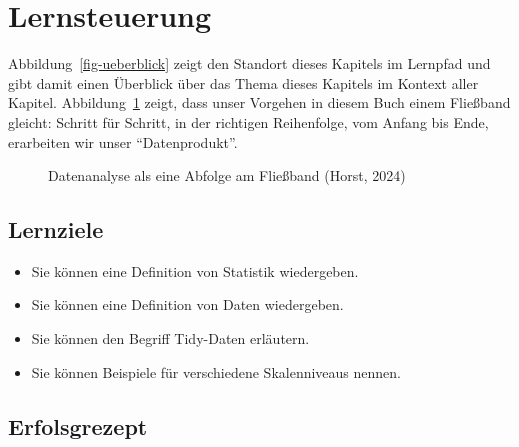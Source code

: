 \documentclass[
  letterpaper,
]{scrbook}
\providecommand{\tightlist}{%
  \setlength{\itemsep}{0pt}\setlength{\parskip}{0pt}}\usepackage{longtable,booktabs,array}
\theoremstyle{definition}
\theoremstyle{definition}
\theoremstyle{definition}
\theoremstyle{remark}
\begin{document}
\section{Lernsteuerung}\label{lernsteuerung}

Abbildung~\ref{fig-ueberblick} zeigt den Standort dieses Kapitels im
Lernpfad und gibt damit einen Überblick über das Thema dieses Kapitels
im Kontext aller Kapitel. Abbildung~\ref{fig-tidy5} zeigt, dass unser
Vorgehen in diesem Buch einem Fließband gleicht: Schritt für Schritt, in
der richtigen Reihenfolge, vom Anfang bis Ende, erarbeiten wir unser
``Datenprodukt''.

\begin{figure}


\caption{\label{fig-tidy5}Datenanalyse als eine Abfolge am Fließband
(Horst, 2024)}

\end{figure}%

\subsection{Lernziele}\label{lernziele-1}

\begin{itemize}
\tightlist
\item
  Sie können eine Definition von Statistik wiedergeben.
\item
  Sie können eine Definition von Daten wiedergeben.
\item
  Sie können den Begriff Tidy-Daten erläutern.
\item
  Sie können Beispiele für verschiedene Skalenniveaus nennen.
\end{itemize}

\subsection{Erfolsgrezept}\label{erfolsgrezept}
\end{document}
